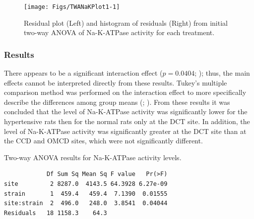 \documentclass[10pt,openany]{book}\usepackage[]{graphicx}\usepackage[]{color}
\makeatletter
\newenvironment{kframe}{%
 \def\at@end@of@kframe{}%
 \ifinner\ifhmode%
  \def\at@end@of@kframe{\end{minipage}}%
  \begin{minipage}{\columnwidth}%
 \fi\fi%
 \def\FrameCommand##1{\hskip\@totalleftmargin \hskip-\fboxsep
 \colorbox{shadecolor}{##1}\hskip-\fboxsep
     \hskip-\linewidth \hskip-\@totalleftmargin \hskip\columnwidth}%
 \MakeFramed {\advance\hsize-\width
   \@totalleftmargin\z@ \linewidth\hsize
   \@setminipage}}%
 {\par\unskip\endMakeFramed%
 \at@end@of@kframe}
\newenvironment{knitrout}{}{} %
\makeatother
\begin{document}
\begin{knitrout}
\color{fgcolor}\begin{figure}[h]

{\centering \texttt{[image: Figs/TWANaKPlot1-1]} 

}

\caption[Residual plot (Left) and histogram of residuals (Right) from initial two-way ANOVA of Na-K-ATPase activity for each treatment]{Residual plot (Left) and histogram of residuals (Right) from initial two-way ANOVA of Na-K-ATPase activity for each treatment.}\label{fig:TWANaKPlot1}
\end{figure}


\end{knitrout}

\subsubsection*{Results}
There appears to be a significant interaction effect ($p=0.0404$; ); thus, the main effects cannot be interpreted directly from these results.  Tukey's multiple comparison method was performed on the interaction effect to more specifically describe the differences among group means (; ).  From these results it was concluded that the level of Na-K-ATPase activity was significantly lower for the hypertensive rats then for the normal rats only at the DCT site.  In addition, the level of Na-K-ATPase activity was significantly greater at the DCT site than at the CCD and OMCD sites, which were not significantly different.

\begin{table}[h]
  \centering
  \caption{Two-way ANOVA results for Na-K-ATPase activity levels.}\label{tab:TWANaKANOVA}
\begin{knitrout}
\color{fgcolor}\begin{kframe}
\begin{verbatim}
            Df Sum Sq Mean Sq F value   Pr(>F)
site         2 8287.0  4143.5 64.3928 6.27e-09
strain       1  459.4   459.4  7.1390  0.01555
site:strain  2  496.0   248.0  3.8541  0.04044
Residuals   18 1158.3    64.3                 
\end{verbatim}
\end{kframe}
\end{knitrout}
\end{table}
\end{document}
